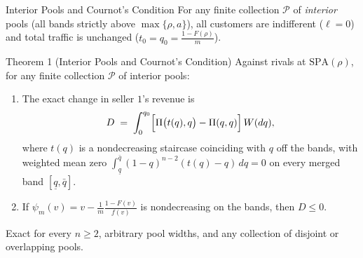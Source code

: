 \documentclass[11pt,aspectratio=169]{beamer}
\newcommand{\SPA}{\mathrm{SPA}}
\newcommand{\uq}{\underline q}
\newcommand{\oq}{\bar q}
\begin{document}
\begin{frame}{Interior Pools and Cournot's Condition}
For any finite collection $\mathcal P$ of \emph{interior} pools (all bands strictly above $\max\{\rho,a\}$), all customers are indifferent ($\ell=0$) and total traffic is unchanged ($t_0=q_0=\frac{1-F(\rho)}{m}$).

\medskip
\begin{block}{Theorem 1 (Interior Pools and Cournot's Condition)}
Against rivals at $\SPA(\rho)$, for any finite collection $\mathcal P$ of interior pools:
\begin{enumerate}
\item The exact change in seller $1$'s revenue is
\[
D \;=\; \int_0^{q_0} \Bigl[\Pi\bigl(t(q),q\bigr) - \Pi(q,q)\Bigr]\,W(dq),
\]
where $t(q)$ is a nondecreasing staircase coinciding with $q$ off the bands, with weighted mean zero $\int_{\uq}^{\oq}(1-q)^{n-2}(t(q)-q)\,dq = 0$ on every merged band $[\uq,\oq]$.
\item If $\psi_m(v)=v-\frac{1}{m}\frac{1-F(v)}{f(v)}$ is nondecreasing on the bands, then $D\le 0$.
\end{enumerate}
\end{block}

Exact for every $n\ge 2$, arbitrary pool widths, and any collection of disjoint or overlapping pools.
\end{frame}
\end{document}
